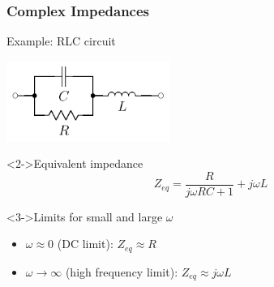 \documentclass[beamer]{standalone}
\begin{document}
\begin{frame}
 \frametitle{Complex Impedances}
 \begin{block}{Example: RLC circuit}
  \begin{center}
   \includegraphics[width=0.4\textwidth]{pics/RLC_circuit}
  \end{center}
 \end{block}
 \begin{block}<2->{Equivalent impedance}
  \begin{equation*}
   Z_{eq} = \frac{R}{j \omega R C + 1} + j \omega L
  \end{equation*}
 \end{block}
 \begin{block}<3->{Limits for small and large $\omega$}
  \begin{itemize}
   \item $\omega \approx 0$ (DC limit): $Z_{eq} \approx R$
   \item $\omega \to \infty$ (high frequency limit): $Z_{eq} \approx j\omega L$
  \end{itemize}
 \end{block}
\end{frame}
\end{document}
